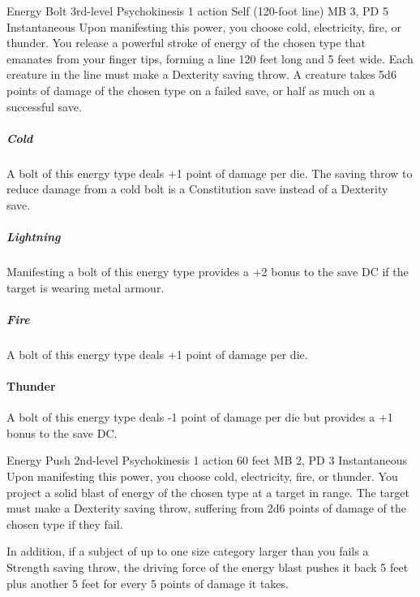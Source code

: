 \DndPowerHeader%
  {Energy Bolt}
  {3rd-level Psychokinesis}
  {1 action}
  {Self (120-foot line)}
  {MB 3, PD 5}
  {Instantaneous}
  Upon manifesting this power, you choose cold, electricity,
  fire, or thunder.
  You release a powerful stroke of energy of the chosen type
  that emanates from your finger tips,
  forming a line 120 feet long and 5 feet wide.
  Each creature in the line must make a Dexterity saving throw.
  A creature takes 5d6 points of damage of the chosen type
  on a failed save,
  or half as much on a successful save.
  
  \subparagraph{Cold}
  A bolt of this energy type deals +1 point of damage per die.
  The saving throw to reduce damage from a cold bolt
  is a Constitution save instead of a Dexterity save.
  
  \subparagraph{Lightning}
  Manifesting a bolt of this energy type provides
  a +2 bonus to the save DC if the target is wearing metal armour.
  
  \subparagraph{Fire}
  A bolt of this energy type deals +1 point of damage per die.
  
  \paragraph{Thunder}
  A bolt of this energy type deals -1 point of damage per die
  but provides a +1 bonus to the save DC.

\DndPowerHeader%
  {Energy Push}
  {2nd-level Psychokinesis}
  {1 action}
  {60 feet}
  {MB 2, PD 3}
  {Instantaneous}
  Upon manifesting this power, you choose cold, electricity, fire, or thunder.
  You project a solid blast of energy of the chosen type at a target in range.
  The target must make a Dexterity saving throw,
  suffering from 2d6 points of damage of the chosen type if they fail.
  
  In addition, if a subject of up to one size category larger than you
  fails a Strength saving throw,
  the driving force of the energy blast pushes it back 5 feet
  plus another 5 feet for every 5 points of damage it takes.
  
